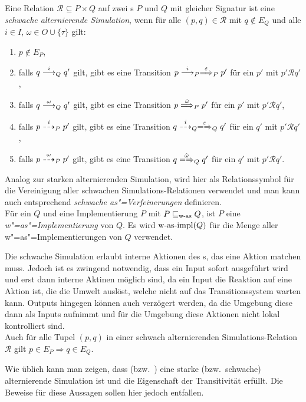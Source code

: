 \begin{Def}
  \label{wSimDef}
  Eine Relation $\mathcal{R} \subseteq P  \times Q$ auf zwei \MEIO{}s $P$ und
  $Q$ mit gleicher Signatur ist eine \emph{schwache alternierende Simulation},
  wenn für alle $(p,q) \in \mathcal{R}$ mit $q\notin E_Q$ und alle $i\in I$,
  $\omega\in O\cup\{\tau\}$ gilt:
  \begin{enumerate}
    \item $p\notin E_P$,
    \item falls $q\must[i]_Q q'$ gilt, gibt es eine Transition $p \must[i]_P
      \weakmust[\varepsilon]_P p'$ für ein $p'$ mit $p'\mathcal{R}q'$,
    \item falls $q\must[\omega]_Q q'$ gilt, gibt es eine Transition $p
      \weakmust[\hat{\omega}]_P p'$ für ein $p'$ mit $p'\mathcal{R}q'$,
    \item falls $p\may[i]_P p'$ gilt, gibt es eine Transition $q
      \may[i]_Q\weakmay[\varepsilon]_Q q'$ für ein $q'$ mit $p'\mathcal{R}q'$,
    \item falls $p\may[\omega]_P p'$ gilt, gibt es eine Transition $q
      \weakmay[\hat{\omega}]_Q q'$ für ein $q'$ mit $p'\mathcal{R}q'$.
  \end{enumerate}
  Analog zur starken alternierenden Simulation, wird hier \wasRel{} als
  Relationssymbol für die Vereinigung aller schwachen Simulations-Relationen
  verwendet und man kann auch entsprechend \emph{schwache as"=Verfeinerungen}
  definieren.\\
  Für ein \MEIO{} $Q$ und eine Implementierung $P$ mit $P\sqsubseteq _{\mathrm{w}\text{-}\mathrm{as}} Q$, ist $P$
  eine \emph{w"=as"=Implementierung} von $Q$. Es wird $\mathrm{w}\text{-}\mathrm{as}\text{-}\mathrm{impl} (Q)$ für die
  Menge aller w"=as"=Implementierungen von $Q$ verwendet.
\end{Def}

Die schwache Simulation erlaubt interne Aktionen des \MEIO{}s, das eine Aktion
matchen muss. Jedoch ist es zwingend notwendig, dass ein Input sofort
ausgeführt wird und erst dann interne Aktinen möglich sind, da ein Input die
Reaktion auf eine Aktion ist, die die Umwelt auslöst, welche nicht auf das
Transitionssystem warten kann. Outputs hingegen können auch verzögert werden,
da die Umgebung diese dann als Inputs aufnimmt und für die Umgebung diese
Aktionen nicht lokal kontrolliert sind.\\
Auch für alle Tupel $(p,q)$ in einer schwach alternierenden
Simulations-Relation $\mathcal{R}$ gilt $p\in E_P\Rightarrow q\in E_Q$.

Wie üblich kann man zeigen, dass \asRel{} (bzw.\ \wasRel{}) eine starke (bzw.\
schwache) alternierende Simulation ist und die Eigenschaft der Transitivität
erfüllt. Die Beweise für diese Aussagen sollen hier jedoch entfallen.

